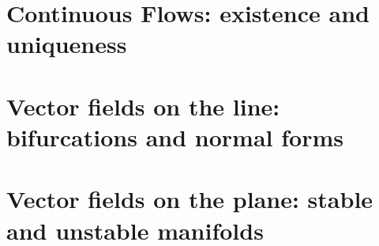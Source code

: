 \documentclass[fleqn]{mc}
\begin{document}
\tableofcontents

\section{Continuous Flows: existence and uniqueness}


\section{Vector fields on the line: bifurcations and normal forms}


\section{Vector fields on the plane: stable and unstable manifolds}



\end{document}
